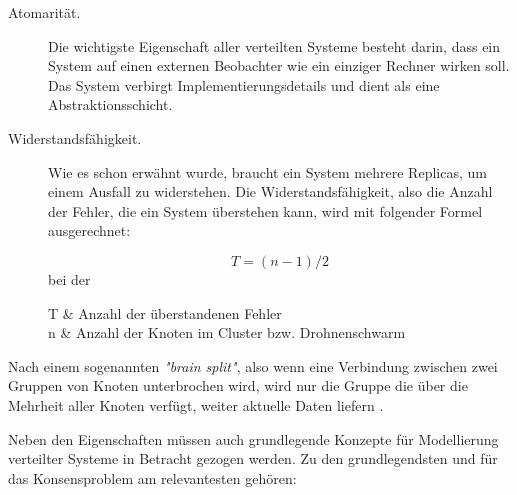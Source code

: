 \begin{description} 
	\item[Atomarität.] Die wichtigste Eigenschaft aller verteilten Systeme besteht darin, dass ein System auf einen externen Beobachter wie ein einziger Rechner wirken soll. Das System verbirgt Implementierungsdetails und dient als eine Abstraktionsschicht.
	
	\item[Widerstandsfähigkeit.] Wie es schon erwähnt wurde, braucht ein System mehrere Replicas, um einem Ausfall zu widerstehen. Die Widerstandsfähigkeit, also die Anzahl der Fehler, die ein System überstehen kann, wird mit folgender Formel ausgerechnet:
	
	\[
	T = (n - 1) / 2
	\]
	bei der
	\begin{conditions*}
		T  &  Anzahl der überstandenen Fehler \\
		n  &  Anzahl der Knoten im Cluster bzw. Drohnenschwarm \\
	\end{conditions*}
\end{description}

Nach einem sogenannten \textit{"brain split"}, also wenn eine Verbindung zwischen zwei Gruppen von Knoten unterbrochen wird, wird nur die Gruppe die über die Mehrheit aller Knoten verfügt, weiter aktuelle Daten liefern \cite{Chandra96unreliablefailure}.

Neben den Eigenschaften müssen auch grundlegende Konzepte für Modellierung verteilter Systeme in Betracht gezogen werden. Zu den grundlegendsten und für das Konsensproblem am relevantesten gehören:

